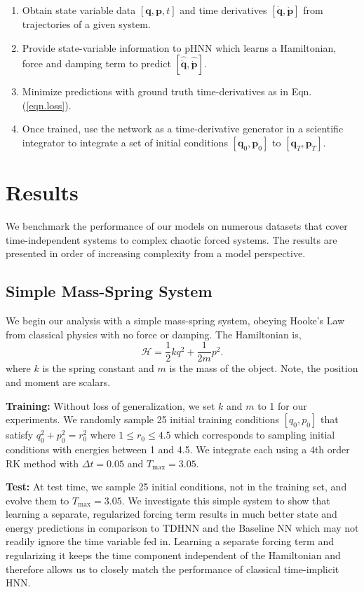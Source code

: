 \documentclass{article}
\begin{document}
\begin{enumerate}
\item Obtain state variable data $[\mathbf{q},\mathbf{p},t]$ and time derivatives $[\dot{\mathbf{q}},\dot{\mathbf{p}}]$ from trajectories of a given system.
\item Provide state-variable information to pHNN which learns a Hamiltonian, force and damping term to predict $[\hat{\dot{\mathbf{q}}},\hat{\dot{\mathbf{p}}}]$.
\item Minimize predictions with ground truth time-derivatives as in Eqn.(\ref{eqn.loss}).
\item Once trained, use the network as a time-derivative generator in a scientific integrator to integrate a set of initial conditions $[\mathbf{q}_0,\mathbf{p}_0]$ to $[\mathbf{q}_T,\mathbf{p}_T]$.
\end{enumerate}

\section{Results}

We benchmark the performance of our models on numerous datasets that cover time-independent systems to complex chaotic forced systems. The results are presented in order of increasing complexity from a model perspective.

\subsection{Simple Mass-Spring System}

We begin our analysis with a simple mass-spring system, obeying Hooke's Law from classical physics with no force or damping. The Hamiltonian is,
\begin{equation}
\mathcal{H} = \frac{1}{2}kq^2 + \frac{1}{2m}p^2. 
\end{equation}
where $k$ is the spring constant and $m$ is the mass of the object. Note, the position and moment are scalars.

\textbf{Training:} Without loss of generalization, we set $k$ and $m$ to 1 for our experiments. We randomly sample 25 initial training conditions $[q_0,p_0]$ that satisfy $q_0^2+p_0^2 = r_0^2$ where $1 \leq r_0 \leq 4.5$ which corresponds to sampling initial conditions with energies between 1 and 4.5. We integrate each using a 4th order RK method with $\Delta t =0.05$ and $T_{\max} = 3.05$. 

\textbf{Test:} At test time, we sample 25 initial conditions, not in the training set, and evolve them to $T_{\max}=3.05$. We investigate this simple system to show that learning a separate, regularized forcing term results in much better state and energy predictions in comparison to TDHNN and the Baseline NN which may not readily ignore the time variable fed in. Learning a separate forcing term and regularizing it keeps the time component independent of the Hamiltonian and therefore allows us to closely match the performance of classical time-implicit HNN. 
\end{document}
